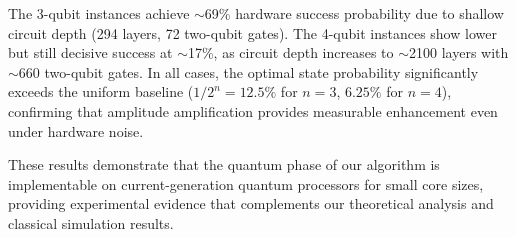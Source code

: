 The 3-qubit instances achieve $\sim$69\% hardware success probability due to shallow circuit depth (294 layers, 72 two-qubit gates). The 4-qubit instances show lower but still decisive success at $\sim$17\%, as circuit depth increases to $\sim$2100 layers with $\sim$660 two-qubit gates. In all cases, the optimal state probability significantly exceeds the uniform baseline ($1/2^n = 12.5\%$ for $n=3$, $6.25\%$ for $n=4$), confirming that amplitude amplification provides measurable enhancement even under hardware noise.

These results demonstrate that the quantum phase of our algorithm is implementable on current-generation quantum processors for small core sizes, providing experimental evidence that complements our theoretical analysis and classical simulation results.
